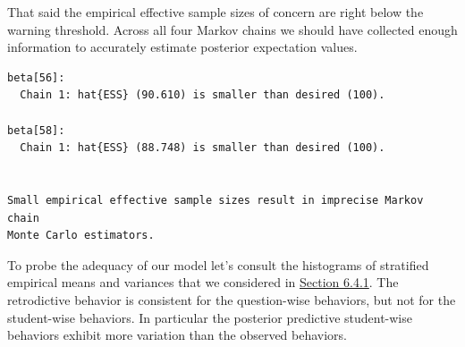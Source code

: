\documentclass[
  letterpaper,
  DIV=11,
  numbers=noendperiod]{scrartcl}
\newenvironment{Shaded}{\begin{snugshade}}{\end{snugshade}}
\newcommand{\FunctionTok}[1]{\textcolor[rgb]{0.28,0.35,0.67}{#1}}
\newcommand{\NormalTok}[1]{\textcolor[rgb]{0.00,0.23,0.31}{#1}}
\newcommand{\OtherTok}[1]{\textcolor[rgb]{0.00,0.23,0.31}{#1}}
\newcommand{\SpecialCharTok}[1]{\textcolor[rgb]{0.37,0.37,0.37}{#1}}
\newcommand{\StringTok}[1]{\textcolor[rgb]{0.13,0.47,0.30}{#1}}
\begin{document}
That said the empirical effective sample sizes of concern are right
below the warning threshold. Across all four Markov chains we should
have collected enough information to accurately estimate posterior
expectation values.

\begin{Shaded}
\end{Shaded}

\begin{verbatim}
beta[56]:
  Chain 1: hat{ESS} (90.610) is smaller than desired (100).

beta[58]:
  Chain 1: hat{ESS} (88.748) is smaller than desired (100).


Small empirical effective sample sizes result in imprecise Markov chain
Monte Carlo estimators.
\end{verbatim}

To probe the adequacy of our model let's consult the histograms of
stratified empirical means and variances that we considered in
\hyperref[sec:irt-data-expl]{Section 6.4.1}. The retrodictive behavior
is consistent for the question-wise behaviors, but not for the
student-wise behaviors. In particular the posterior predictive
student-wise behaviors exhibit more variation than the observed
behaviors.
\end{document}
